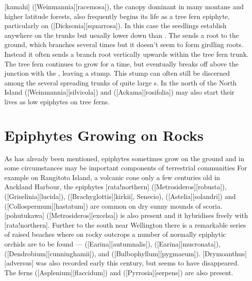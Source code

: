 [kamahi] ([Weinmannia][racemosa]), the canopy dominant in many montane and higher latitude forests, also frequently begins its life as a tree fern epiphyte, particularly on  ([Dicksonia][squarrosa]).
In this case the seedlings establish anywhere on the trunks but usually lower down than .
The  sends a root to the ground, which branches several times but it doesn't seem to form girdling roots.
Instead it often sends a branch root vertically upwards within the tree fern trunk.
The tree fern continues to grow for a time, but eventually breaks off above the junction with the , leaving a stump.
This stump can often still be discerned among the several spreading trunks of quite large s.
In the north of the North Island  ([Weinmannia][silvicola]) and  ([Ackama][rosifolia]) may also start their lives as low epiphytes on tree ferns.

\section{Epiphytes Growing on Rocks}

As has already been mentioned, epiphytes sometimes grow on the ground and in some circumstances may be important components of terrestrial communities For example on Rangitoto Island, a volcanic cone only a few centuries old in Auckland Harbour, the epiphytes [rata!northern] ([Metrosideros][robusta]),  ([Griselinia][lucida]),  ([Brachyglottis][kirkii], Senecio),  ([Astelia][solandri]) and  ([Collospermum][hastatum]) are common on dry sunny mounds of scoria.
[pohutukawa] ([Metrosideros][excelsa]) is also present and it hybridises freely with [rata!northern].
Further to the south near Wellington there is a remarkable series of raised beaches where on rocky outcrops a number of normally epiphytic orchids are to be found ---  ([Earina][autumnalis]),  ([Earina][mucronata]),  ([Dendrobium][cunninghamii]), and  ([Bulbophyllum][pygmaeum]).
[Drymoanthus][adversus] was also recorded early this century, but seems to have disappeared.
The ferns  ([Asplenium][flaccidum]) and  ([Pyrrosia][serpens]) are also present.

